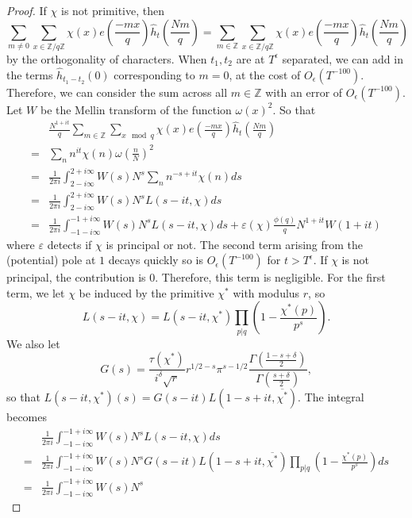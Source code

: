 \begin{proof}
    If $\chi$ is not primitive, then \[
        \sum_{m\neq 0} \sum_{x \in \mathbb{Z}/q\mathbb{Z}}\chi(x) e\left(\frac{-mx}{q}\right)
        \hat{h}_{t}\left(\frac{Nm}{q}\right)=\sum_{m\in \mathbb{Z}} \sum_{x \in \mathbb{Z}/q\mathbb{Z}}\chi(x) e\left(\frac{-mx}{q}\right)
        \hat{h}_{t}\left(\frac{Nm}{q}\right)
    \] by the orthogonality of characters.
    When $t_1,t_2$ are at $T^\epsilon$ separated, we can add in the terms $\hat{h}_{t_1-t_2}(0)$ corresponding to $m=0$, at the cost of $O_\epsilon(T^{-100})$. Therefore, we can consider the sum across all $m\in\mathbb{Z}$ with an error of $O_\epsilon(T^{-100})$. Let $W$ be the Mellin transform of the function $\omega(x)^2$. So that
\begin{align*}
    &\frac{N^{1+it}}{q}\sum_{m\in \mathbb{Z}} \sum_{x \mod q}\chi(x) e\left(\frac{-mx}{q}\right)
    \hat{h}_{t}\left(\frac{Nm}{q}\right) \\
    =& \sum_{n} n^{it}\chi(n)\omega\left(\frac{n}{N}\right)^2\\
    =& \frac{1}{2\pi i}\int_{2-i\infty}^{2+i\infty}W(s)N^s \sum_n n^{-s+it}\chi(n) ds\\
    =& \frac{1}{2\pi i}\int_{2-i\infty}^{2+i\infty}W(s)N^s L(s-it,\chi) ds\\
    =& \frac{1}{2\pi i}\int_{-1-i\infty}^{-1+i\infty}W(s)N^sL(s-it,\chi) ds + \varepsilon(\chi)\frac{\phi(q)}{q}N^{1+it}W(1+it)
\end{align*}
where $\varepsilon$ detects if $\chi$ is principal or not. The second term arising from the (potential) pole at $1$ decays quickly so is $O_{\epsilon}(T^{-100})$ for $t>T^\epsilon$. If $\chi$ is not principal, the contribution is $0$. Therefore, this term is negligible. 
For the first term, we let $\chi$ be induced by the primitive $\chi^*$ with modulus $r$, so\[
    L(s-it,\chi)=L(s-it,\chi^*)\prod_{p|q} \left(1-\frac{\chi^*(p)}{p^s}\right).
\]
We also let \[
    G(s) =\frac{\tau(\chi^*)}{i^\delta\sqrt{r}}r^{1/2-s}\pi^{s-1/2}\frac{\Gamma(\frac{1-s+\delta}{2})}{\Gamma(\frac{s+\delta}{2})},
\]
so that $L(s-it,\chi^*)(s) = G(s-it)L(1-s+it,\overline{\chi^*})$. The integral becomes
\begin{align*}
   &\frac{1}{2\pi i}\int_{-1-i\infty}^{-1+i\infty}W(s)N^sL(s-it,\chi) ds \\=&\frac{1}{2\pi i}
   \int_{-1-i\infty}^{-1+i\infty}W(s)N^s
    G(s-it) L(1-s+it,\overline{\chi^*}) \prod_{p|q} \left(1-\frac{\chi^*(p)}{p^s}\right)ds\\
    =& \frac{1}{2\pi i}\int_{-1-i\infty}^{-1+i\infty}W(s)N^s

\end{align*}
\end{proof}
